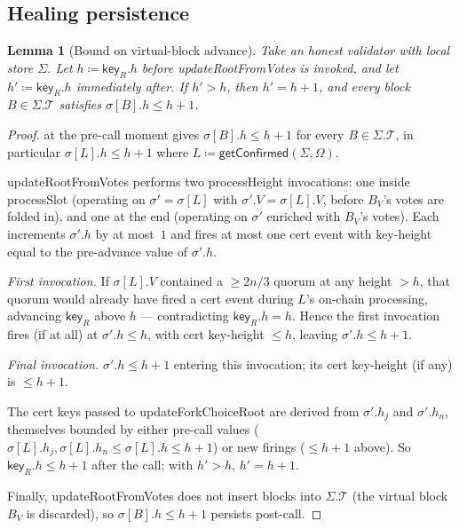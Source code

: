 \documentclass{article}
\newcommand{\T}[0]{\ensuremath{\mathcal{T}}}
\newcommand{\key}{\mathsf{key}}
\newcommand{\processSlot}{\textsf{processSlot}\xspace}
\newcommand{\processHeight}{\textsf{processHeight}\xspace}
\newcommand{\updateForkChoiceRoot}{\textsf{updateForkChoiceRoot}\xspace}
\newcommand{\updateRootFromVotes}{\textsf{updateRootFromVotes}\xspace}
\newcommand{\getConfirmed}{\textsf{getConfirmed}\xspace}
\theoremstyle{plain}
\newtheorem{lemma}{Lemma}
\theoremstyle{definition}
\theoremstyle{remark}
\begin{document}
\subsection{Healing persistence}\label{rev:sec:healing-persistence}


\begin{lemma}[Bound on virtual-block advance]\label{rev:lem:virtual-block-advance}
Take an honest validator with local store $\Sigma$. Let $h \coloneqq \key_R.h$ before \updateRootFromVotes is invoked, and let $h' \coloneqq \key_R.h$ immediately after. If $h' > h$, then $h' = h+1$, and every block $B \in \Sigma.\T$ satisfies $\sigma[B].h \leq h+1$.
\end{lemma}

\begin{proof}
 at the pre-call moment gives $\sigma[B].h \leq h+1$ for every $B \in \Sigma.\T$, in particular $\sigma[L].h \leq h+1$ where $L \coloneqq \getConfirmed(\Sigma, \Omega)$.

\updateRootFromVotes performs two \processHeight{} invocations: one inside \processSlot{} (operating on $\sigma' = \sigma[L]$ with $\sigma'.V = \sigma[L].V$, before $B_V$'s votes are folded in), and one at the end (operating on $\sigma'$ enriched with $B_V$'s votes). Each increments $\sigma'.h$ by at most~$1$ and fires at most one cert event with key-height equal to the pre-advance value of $\sigma'.h$.

\emph{First invocation.}
If $\sigma[L].V$ contained a $\geq 2n/3$ quorum at any height $>h$, that quorum would already have fired a cert event during $L$'s on-chain processing, advancing $\key_R$ above $h$ — contradicting $\key_R.h = h$. Hence the first invocation fires (if at all) at $\sigma'.h \leq h$, with cert key-height $\leq h$, leaving $\sigma'.h \leq h+1$.

\emph{Final invocation.}
$\sigma'.h \leq h+1$ entering this invocation; its cert key-height (if any) is $\leq h+1$.

The cert keys passed to \updateForkChoiceRoot{} are derived from $\sigma'.h_j$ and $\sigma'.h_n$, themselves bounded by either pre-call values ($\sigma[L].h_j, \sigma[L].h_n \leq \sigma[L].h \leq h+1$) or new firings ($\leq h+1$ above). So $\key_R.h \leq h+1$ after the call; with $h' > h$, $h' = h+1$.

Finally, \updateRootFromVotes does not insert blocks into $\Sigma.\T$ (the virtual block $B_V$ is discarded), so $\sigma[B].h \leq h+1$ persists post-call.
\end{proof}
\end{document}
